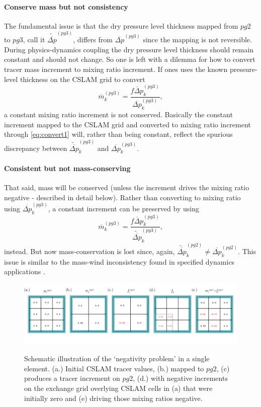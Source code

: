 \paragraph{Conserve mass but not consistency} 
The fundamental issue is that the dry pressure level thickness mapped from $pg2$ to $pg3$, call it $\widetilde{\overline{\Delta p}}^{(pg3)}$, differs from $\overline{\Delta p}^{(pg3)}$ since the mapping is not reversible. During physics-dynamics coupling the dry pressure level thickness should remain constant and should not change. So one is left with a dilemma for how to convert tracer mass increment to mixing ratio increment. If ones uses the known pressure-level thickness on the CSLAM grid to convert
\begin{equation}
\label{eq:convert1}
\overline{m}^{(pg3)}_k=\frac{\overline{f\Delta p}^{(pg3)}_k}{{\overline{\Delta p}}^{(pg3)}_k},
\end{equation}
a constant mixing ratio increment is not conserved. Basically the constant increment mapped to the CSLAM grid and converted to mixing ratio increment through \eqref{eq:convert1} will, rather than being constant, reflect the spurious discrepancy between $\widetilde{\overline{\Delta p}}^{(pg3)}_k$ and ${\overline{\Delta p}}^{(pg3)}_k$. 
\paragraph{Consistent but not mass-conserving} 
That said, mass will be conserved (unless the increment drives the mixing ratio negative - described in detail below). Rather than converting to mixing ratio using ${\overline{\Delta p}}^{(pg3)}_k$, a constant increment can be preserved by using
\begin{equation}
\overline{m}^{(pg3)}_k=\frac{\overline{f\Delta p}^{(pg3)}_k}{\widetilde{\overline{\Delta p}}^{(pg3)}_k},
\end{equation}
instead. But now mass-conservation is lost since, again, $\widetilde{\overline{\Delta p}}^{(pg2)}_k\ne {\overline{\Delta p}}^{(pg2)}_k$. This issue is similar to the mass-wind inconsistency found in specified dynamics applications \citep[e.g.][]{JKLSBCRE2001QJR,L2009LNCE}. 

\begin{figure}[t]
\begin{center}
\noindent\includegraphics[width=30pc,angle=0]{figs/alg-schematic.png}\\
\end{center}
\caption{Schematic illustration of the `negativity problem' in a single element. (a.) Initial CSLAM tracer values, (b.) mapped to $pg2$, (c) produces a tracer increment on $pg2$, (d.) with negative increments on the exchange grid overlying CSLAM cells in (a) that were initially zero and (e) driving those mixing ratios negative.}
\label{fig:alg-schematic}
\end{figure}

